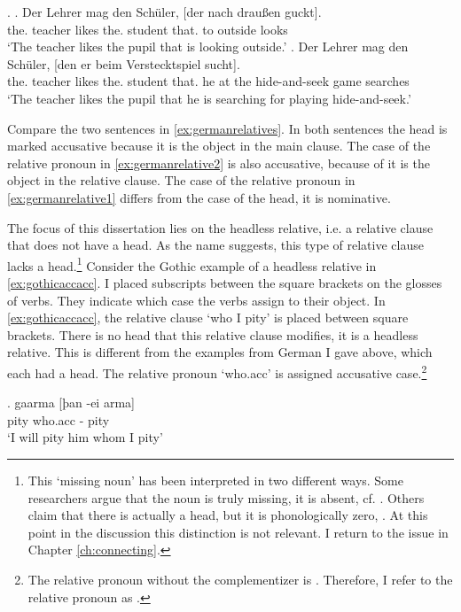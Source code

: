 \ex.\label{ex:germanrelatives}
\ag. Der Lehrer mag den Schüler, [der nach draußen guckt].\\
 the. teacher likes the. student that. to outside looks\\
 `The teacher likes the pupil that is looking outside.'\label{ex:germanrelative1}
 \bg. Der Lehrer mag den Schüler, [den er beim Verstecktspiel sucht].\\
 the. teacher likes the. student that. he {at the} {hide-and-seek game} searches\\
 `The teacher likes the pupil that he is searching for playing hide-and-seek.'\label{ex:germanrelative2}

Compare the two sentences in \ref{ex:germanrelatives}. In both sentences the head is marked accusative because it is the object in the main clause. The case of the relative pronoun in \ref{ex:germanrelative2} is also accusative, because of it is the object in the relative clause. The case of the relative pronoun in \ref{ex:germanrelative1} differs from the case of the head, it is nominative.


The focus of this dissertation lies on the headless relative, i.e. a relative clause that does not have a head. As the name suggests, this type of relative clause lacks a head.\footnote{
This `missing noun' has been interpreted in two different ways. Some researchers argue that the noun is truly missing, it is absent, cf. \citealt{vanriemsdijk2006}. Others claim that there is actually a head, but it is phonologically zero, \citealt{himmelreich2017}. At this point in the discussion this distinction is not relevant. I return to the issue in Chapter \ref{ch:connecting}.
}
Consider the Gothic example of a headless relative in \ref{ex:gothicaccacc}. I placed subscripts between the square brackets on the glosses of verbs. They indicate which case the verbs assign to their object.
In \ref{ex:gothicaccacc}, the relative clause  `who I pity' is placed between square brackets. There is no head that this relative clause modifies, it is a headless relative. This is different from the examples from German I gave above, which each had a head.
The relative pronoun  `who.\ac{acc}' is assigned accusative case.\footnote{
The relative pronoun without the complementizer  is . Therefore, I refer to the relative pronoun as .
}

\exg. gaarma [þan -ei arma]\\
 pity\scsub{[acc]} who.\ac{acc} - pity\scsub{[acc]}\\
 `I will pity him whom I pity' \label{ex:gothicaccacc}

